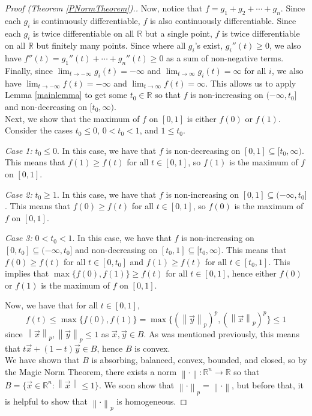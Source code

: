 \documentclass{article}
\newcommand{\R}{\mathbb{R}}
\newcommand{\norm}[1]{\left\|#1\right\|}
\theoremstyle{plain} %
\numberwithin{thm}{section} %
\theoremstyle{definition} %
\begin{document}
\begin{proof}[Proof (Theorem \ref{PNormTheorem}).]
Now, notice that $f = g_1 + g_2 + \cdots + g_n$. Since each $g_i$ is continuously differentiable, $f$ is also continuously differentiable. Since each $g_i$ is twice differentiable on all $\R$ but a single point, $f$ is twice differentiable on all $\R$ but finitely many points. Since where all $g_i$'s exist, $g_i''(t) \geq 0$, we also have $f''(t) = g_1''(t) + \cdots + g_n''(t) \geq 0$ as a sum of non-negative terms. Finally, since $\lim_{t \to -\infty}g_i(t) = -\infty$ and $\lim_{t \to \infty}g_i(t) = \infty$ for all $i$, we also have $\lim_{t \to -\infty} f(t) = -\infty$ and $\lim_{t \to \infty} f(t) = \infty$. This allows us to apply Lemma \ref{mainlemma} to get some $t_0 \in \R$ so that $f$ is non-increasing on $(-\infty, t_0]$ and non-decreasing on $[t_0, \infty)$.\\

Next, we show that the maximum of $f$ on $[0, 1]$ is either $f(0)$ or $f(1)$. Consider the cases $t_0 \leq 0$, $0 < t_0 < 1$, and $1 \leq t_0$.

\textit{Case 1:} $t_0 \leq 0$. In this case, we have that $f$ is non-decreasing on $[0, 1] \subseteq [t_0, \infty)$. This means that $f(1) \geq f(t)$ for all $t \in [0, 1]$, so $f(1)$ is the maximum of $f$ on $[0, 1]$.

\textit{Case 2:} $t_0 \geq 1$. In this case, we have that $f$ is non-increasing on $[0, 1] \subseteq (-\infty, t_0]$. This means that $f(0) \geq f(t)$ for all $t \in [0, 1]$, so $f(0)$ is the maximum of $f$ on $[0, 1]$.

\textit{Case 3:} $0 < t_0 < 1$. In this case, we have that $f$ is non-increasing on $[0, t_0] \subseteq (-\infty, t_0]$ and non-decreasing on $[t_0, 1] \subseteq [t_0, \infty)$. This means that $f(0) \geq f(t)$ for all $t \in [0, t_0]$ and $f(1) \geq f(t)$ for all $t \in [t_0, 1]$. This implies that $\max\{f(0), f(1)\} \geq f(t)$ for all $t \in [0, 1]$, hence either $f(0)$ or $f(1)$ is the maximum of $f$ on $[0, 1]$.

Now, we have that for all $t \in [0, 1]$, \[
f(t) \leq \max\{f(0), f(1)\} = \max\{(\norm{\vec{y}}_p)^p, (\norm{\vec{x}}_p)^p\} \leq 1
\]
since $\norm{\vec{x}}_p, \norm{\vec{y}}_p \leq 1$ as $\vec{x}, \vec{y} \in B$. As was mentioned previously, this means that $t\vec{x} + (1 - t)\vec{y} \in B$, hence $B$ is convex.\\

We have shown that $B$ is absorbing, balanced, convex, bounded, and closed, so by the Magic Norm Theorem, there exists a norm $\norm{\cdot}: \R^n \to \R$ so that $B = \{\vec{x} \in \R^n: \norm{\vec{x}} \leq 1\}$. We soon show that $\norm{\cdot}_p = \norm{\cdot}$, but before that, it is helpful to show that $\norm{\cdot}_p$ is homogeneous.


\end{proof}
\end{document}
